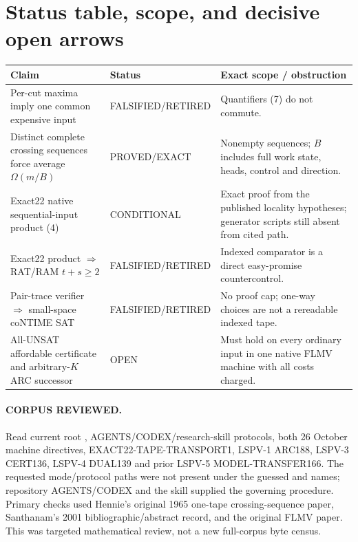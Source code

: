 \documentclass[11pt]{article}
\begin{document}
\section{Status table, scope, and decisive open arrows}
\begin{center}\small
\begin{tabularx}{.98\linewidth}{p{.42\linewidth}p{.20\linewidth}X}\toprule
Claim & Status & Exact scope / obstruction\\\midrule
Per-cut maxima imply one common expensive input & FALSIFIED/RETIRED & Quantifiers (7) do not commute.\\
Distinct complete crossing sequences force average $\Omega(m/B)$ & PROVED/EXACT & Nonempty sequences; $B$ includes full work state, heads, control and direction.\\
Exact22 native sequential-input product (4) & CONDITIONAL & Exact proof from the published locality hypotheses; generator scripts still absent from cited path.\\
Exact22 product $\Rightarrow$ RAT/RAM $t+s\ge2$ & FALSIFIED/RETIRED & Indexed comparator is a direct easy-promise countercontrol.\\
Pair-trace verifier $\Rightarrow$ small-space coNTIME SAT & FALSIFIED/RETIRED & No proof cap; one-way choices are not a rereadable indexed tape.\\
All-UNSAT affordable certificate and arbitrary-$K$ ARC successor & OPEN & Must hold on every ordinary input in one native FLMV machine with all costs charged.\\\bottomrule
\end{tabularx}
\end{center}

\paragraph{CORPUS REVIEWED.}
Read current root , AGENTS/CODEX/research-skill protocols, both 26 October machine directives, EXACT22-TAPE-TRANSPORT1, LSPV-1 ARC188, LSPV-3 CERT136, LSPV-4 DUAL139 and prior LSPV-5 MODEL-TRANSFER166.  The requested mode/protocol paths were not present under the guessed  and  names; repository AGENTS/CODEX and the skill supplied the governing procedure.  Primary checks used Hennie's original 1965 one-tape crossing-sequence paper, Santhanam's 2001 bibliographic/abstract record, and the original FLMV paper.  This was targeted mathematical review, not a new full-corpus byte census.
\end{document}
